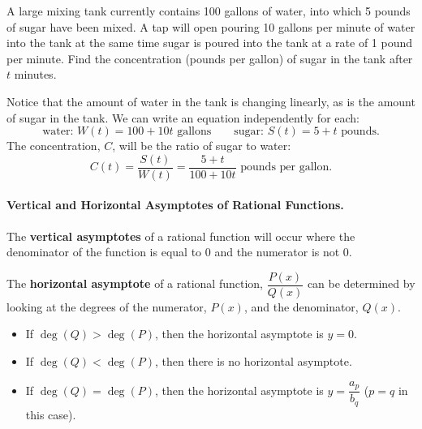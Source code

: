 \begin{example}
	\label{ex:sugarconcentration}
A large mixing tank currently contains 100 gallons of water, into which 5 pounds of sugar have been mixed. A tap will open pouring 10 gallons per minute of water into the tank at the same time sugar is poured into the tank at a rate of 1 pound per minute. Find the concentration (pounds per gallon) of sugar in the tank after $t$ minutes.

\begin{solution} Notice that the amount of water in the tank is changing linearly, as is the amount of sugar in the tank. We can write an equation independently for each:
$$\text{water: } W(t)=100+10t \mbox{ gallons}\qquad \text{sugar: } S(t)=5+t \mbox{ pounds.}$$
The concentration, $C$, will be the ratio of sugar to water:
$$C(t)=\frac{S(t)}{W(t)} = \dfrac{5+t}{100+10t} \mbox{ pounds per gallon.}$$
\end{solution}\end{example}

\paragraph*{Vertical and Horizontal Asymptotes of Rational Functions.}
The {\bf vertical asymptotes} of a rational function will occur where the denominator of the function is equal to 0 and the numerator is not 0.

The {\bf horizontal asymptote} of a rational function, $\dfrac{P(x)}{Q(x)}$ can be determined by looking at the degrees of the numerator, $P(x)$, and the denominator, $Q(x)$.
\begin{itemize}
  \item If $\deg(Q) > \deg(P)$, then the horizontal asymptote is $y=0$.
  \item If $\deg(Q) < \deg(P)$, then there is no horizontal asymptote.
  \item If $\deg(Q) = \deg(P)$, then the horizontal asymptote is $y=\dfrac{a_p}{b_q}$ ($p = q$ in this case).
\end{itemize}

